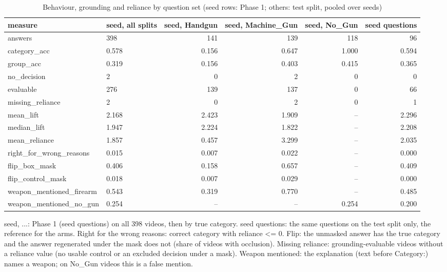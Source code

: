 \begin{table}[htbp]
\centering
\scriptsize
\caption{Behaviour, grounding and reliance by question set (seed rows: Phase 1; others: test split, pooled over seeds)}\label{tab:R5}
\begin{adjustbox}{max width=\textwidth}
\begin{tabular}{llrrrr}
\toprule
measure & seed, all splits & seed, Handgun & seed, Machine\_\allowbreak{}Gun & seed, No\_\allowbreak{}Gun & seed questions \\
\midrule
answers & 398 & 141 & 139 & 118 & 96 \\
category\_acc & 0.578 & 0.156 & 0.647 & 1.000 & 0.594 \\
group\_acc & 0.319 & 0.156 & 0.403 & 0.415 & 0.365 \\
no\_decision & 2 & 0 & 2 & 0 & 0 \\
evaluable & 276 & 139 & 137 & 0 & 66 \\
missing\_reliance & 2 & 0 & 2 & 0 & 1 \\
mean\_lift & 2.168 & 2.423 & 1.909 & -- & 2.296 \\
median\_lift & 1.947 & 2.224 & 1.822 & -- & 2.208 \\
mean\_reliance & 1.857 & 0.457 & 3.299 & -- & 2.035 \\
right\_for\_wrong\_reasons & 0.015 & 0.007 & 0.022 & -- & 0.000 \\
flip\_box\_mask & 0.406 & 0.158 & 0.657 & -- & 0.409 \\
flip\_control\_mask & 0.018 & 0.007 & 0.029 & -- & 0.000 \\
weapon\_mentioned\_firearm & 0.543 & 0.319 & 0.770 & -- & 0.485 \\
weapon\_mentioned\_no\_gun & 0.254 & -- & -- & 0.254 & 0.200 \\
\bottomrule
\end{tabular}
\end{adjustbox}
\par\smallskip\parbox{\textwidth}{\footnotesize seed, ...: Phase 1 (seed questions) on all 398 videos, then by true category. seed questions: the same questions on the test split only, the reference for the arms. Right for the wrong reasons: correct category with reliance <= 0. Flip: the unmasked answer has the true category and the answer regenerated under the mask does not (share of videos with occlusion). Missing reliance: grounding-evaluable videos without a reliance value (no usable control or an excluded decision under a mask). Weapon mentioned: the explanation (text before Category:) names a weapon; on No\_Gun videos this is a false mention.}
\end{table}
